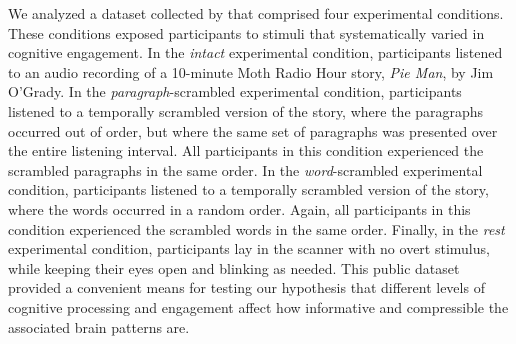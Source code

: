 \documentclass[english, 11pt]{article}
\begin{document}
We analyzed a dataset collected by \cite{SimoEtal16} that comprised four
experimental conditions. These conditions exposed participants to stimuli that
systematically varied in cognitive engagement. In the \textit{intact}
experimental condition, participants listened to an audio recording of a
10-minute Moth Radio Hour story, \textit{Pie Man}, by Jim O'Grady. In the
\textit{paragraph}-scrambled experimental condition, participants listened to a
temporally scrambled version of the story, where the paragraphs occurred out of
order, but where the same set of paragraphs was presented over the entire
listening interval. All participants in this condition experienced the
scrambled paragraphs in the same order. In the \textit{word}-scrambled
experimental condition, participants listened to a temporally scrambled version
of the story, where the words occurred in a random order. Again, all
participants in this condition experienced the scrambled words in the same
order. Finally, in the \textit{rest} experimental condition, participants lay
in the scanner with no overt stimulus, while keeping their eyes open and
blinking as needed. This public dataset provided a convenient means for testing
our hypothesis that different levels of cognitive processing and engagement
affect how informative and compressible the associated brain patterns are.
\end{document}
